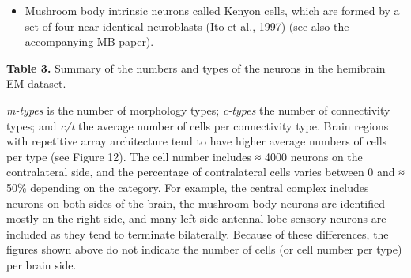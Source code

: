 \documentclass{article}
\begin{document}
\begin{itemize}
\item Mushroom body intrinsic neurons called Kenyon cells, which are formed by a set of four near-identical neuroblasts (Ito et al., 1997) (see also the accompanying MB paper).
\end{itemize}

\noindent \textbf{Table 3.} Summary of the numbers and types of the neurons in the hemibrain EM dataset.

\noindent \emph{m-types} is the number of morphology types; \emph{c-types} the number of connectivity types; and \emph{c/t} the average number of cells per connectivity type. Brain regions with repetitive array architecture tend to have higher average numbers of cells per type (see Figure 12). The cell number includes ≈ 4000 neurons on the contralateral side, and the percentage of contralateral cells varies between 0 and ≈ 50\% depending on the category. For example, the central complex includes neurons on both sides of the brain, the mushroom body neurons are identified mostly on the right side, and many left-side antennal lobe sensory neurons are included as they tend to terminate bilaterally. Because of these differences, the figures shown above do not indicate the number of cells (or cell number per type) per brain side.
\end{document}
